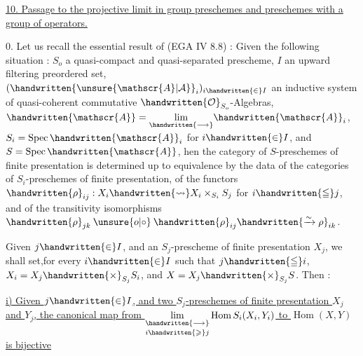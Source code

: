 
\uline{10. Passage to the projective limit in group preschemes and preschemes with a group of operators.}

0. Let us recall the essential result of (EGA IV 8.8) : Given the following situation : $S_o$ a qu\handwritten{/}asi-compact and quasi-separated prescheme, $I$ an upward filtering preordered set, $(\handwritten{\unsure{\mathscr{A}|\mathcal{A}}}_i)_{i\handwritten{\in}I}$ an inductive system of quasi-coherent commutative $\handwritten{\mathcal{O}}_{S_o}$-Algebras, $\handwritten{\mathscr{A}}=\underset{\handwritten{\longrightarrow}}{\lim}\handwritten{\mathscr{A}}_i$, $S_i=\operatorname{Spec}\handwritten{\mathscr{A}}_i$ for $i\handwritten{\in}I$, and $S=\operatorname{Spec}\handwritten{\mathscr{A}}$, hen the category of $S$-preschemes of finite presentation is determined up to equivalence by the data of the categories of $S_i$-preschemes of finite presentation, of the functors  $\handwritten{\rho}_{ij}:X_i\handwritten{\rightsquigarrow}X_i\times_{S_i}S_j$ \deleted{\unsure{,}} for $i\handwritten{\leqq}j$, and of the transitivity isomorphisms $\handwritten{\rho}_{jk}\mathbin{\unsure{o|\circ}}\handwritten{\rho}_{ij}\handwritten{\xrightarrow{\sim}\rho}_{ik}$.  

Given $j\handwritten{\in}I$, and an $S_j$-prescheme of finite presentation $X_j$, we shall set,for every $i\handwritten{\in}I$ such that $j\handwritten{\leqq}i$, $X_i=X_j\handwritten{\times}_{S_j}S_i$, and $X=X_j\handwritten{\times}_{S_j}S$. Then :\handwritten{\unsure{;|:}}\margin{\handwritten{(}}

\uline{i) Given $j\handwritten{\in}I$, and two $S_j$-preschemes of finite presentation $X_j$ and $Y_j$, the canonical map from $\underset{i\handwritten{\geqslant}j}{\underset{\handwritten{\longrightarrow}}{\lim}}\operatorname{Hom} S_i(X_i,Y_i)$ to $\operatorname{Hom}(X,Y)$ is bijective}\margin{\handwritten{(}}

